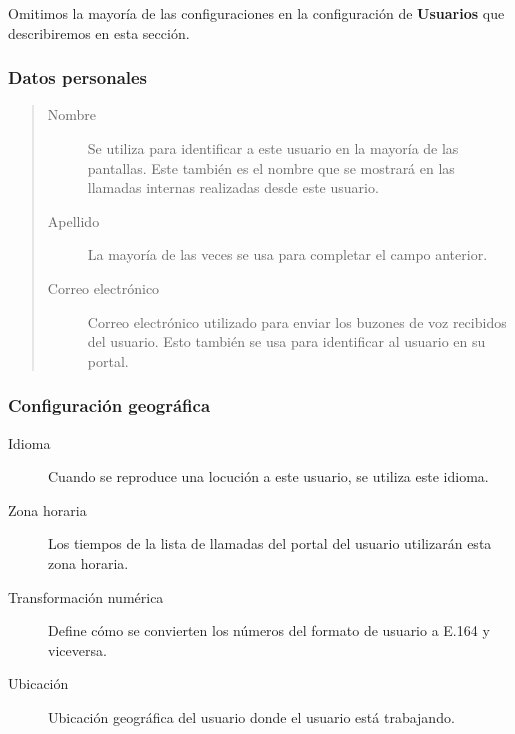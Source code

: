 \documentclass[letterpaper,10pt,spanish]{sphinxmanual}
\begin{document}
Omitimos la mayoría de las configuraciones en la configuración de \textbf{Usuarios} que describiremos en esta sección.


\subsubsection{Datos personales}
\label{administration_portal/client/vpbx/users:personal-data}\begin{quote}
\begin{description}
\item[{Nombre}] \leavevmode
Se utiliza para identificar a este usuario en la mayoría de las pantallas. Este también es el nombre que se mostrará en las llamadas internas realizadas desde este usuario.

\item[{Apellido}] \leavevmode
La mayoría de las veces se usa para completar el campo anterior.

\item[{Correo electrónico}] \leavevmode
Correo electrónico utilizado para enviar los buzones de voz recibidos del usuario. Esto también se usa para identificar al usuario en su portal.

\end{description}
\end{quote}


\subsubsection{Configuración geográfica}
\label{administration_portal/client/vpbx/users:geographic-configuration}\begin{description}
\item[{Idioma}] \leavevmode{}\label{administration_portal/client/vpbx/users:term-language}
Cuando se reproduce una locución a este usuario, se utiliza este idioma.

\item[{Zona horaria}] \leavevmode{}\label{administration_portal/client/vpbx/users:term-timezone}
Los tiempos de la lista de llamadas del portal del usuario utilizarán esta zona horaria.

\item[{Transformación numérica}] \leavevmode{}\label{administration_portal/client/vpbx/users:term-numeric-transformation}
Define cómo se convierten los números del formato de usuario a E.164 y viceversa.

\item[{Ubicación}] \leavevmode{}\label{administration_portal/client/vpbx/users:term-location}
Ubicación geográfica del usuario donde el usuario está trabajando.

\end{description}
\end{document}
